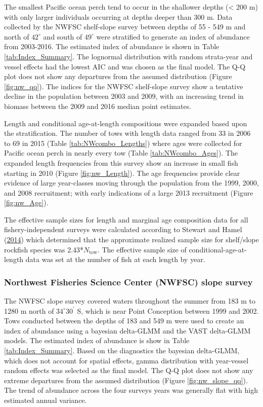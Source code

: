 \documentclass[12pt,]{article}
\begin{document}
The smallest Pacific ocean perch tend to occur in the shallower depths
(\textless{} 200 m) with only larger individuals occurring at depths
deeper than 300 m. Data collected by the NWFSC shelf-slope survey
between depths of 55 - 549 m and north of \(42^\circ\) and south of
\(49^\circ\) were stratified to generate an index of abundance from
2003-2016. The estimated index of abundance is shown in Table
\ref{tab:Index_Summary}. The lognormal distribution with random
strata-year and vessel effects had the lowest AIC and was chosen as the
final model. The Q-Q plot does not show any departures from the assumed
distribution (Figure \ref{fig:nw_qq}). The indices for the NWFSC
shelf-slope survey show a tentative decline in the population between
2003 and 2009, with an increasing trend in biomass between the 2009 and
2016 median point estimates.

Length and conditional age-at-length compositions were expanded based
upon the stratification. The number of tows with length data ranged from
33 in 2006 to 69 in 2015 (Table \ref{tab:NWcombo_Lengths}) where ages
were collected for Pacific ocean perch in nearly every tow (Table
\ref{tab:NWcombo_Ages}). The expanded length frequencies from this
survey show an increase in small fish starting in 2010 (Figure
\ref{fig:nw_Length}). The age frequencies provide clear evidence of
large year-classes moving through the population from the 1999, 2000,
and 2008 recruitment; with early indications of a large 2013 recruitment
(Figure \ref{fig:nw_Age}).

The effective sample sizes for length and marginal age composition data
for all fishery-independent surveys were calculated according to Stewart
and Hamel (\protect\hyperlink{ref-stewart_bootstrapping_2014}{2014})
which determined that the approximate realized sample size for
shelf/slope rockfish species was 2.43*\(N_{\text{tow}}\). The effective
sample size of conditional-age-at-length data was set at the number of
fish at each length by year.

\subsubsection{Northwest Fisheries Science Center (NWFSC) slope
survey}\label{northwest-fisheries-science-center-nwfsc-slope-survey}

The NWFSC slope survey covered waters throughout the summer from 183 m
to 1280 m north of \(34^\circ 30^\prime\) S, which is near Point
Conception between 1999 and 2002. Tows conducted between the depths of
183 and 549 m were used to create an index of abundance using a bayesian
delta-GLMM and the VAST delta-GLMM models. The estimated index of
abundance is show in Table \ref{tab:Index_Summary}. Based on the
diagnostics the bayesian delta-GLMM, which does not account for spatial
effects, gamma distribution with year-vessel random effects was selected
as the final model. The Q-Q plot does not show any extreme departures
from the assumed distribution (Figure \ref{fig:nw_slope_qq}). The trend
of abundance across the four surveys years was generally flat with high
estimated annual variance.
\end{document}
